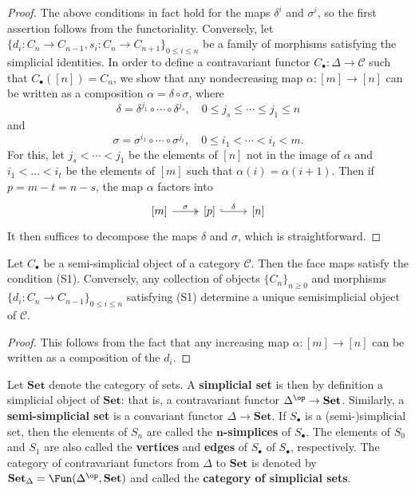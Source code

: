 \begin{proof}
The above conditions in fact hold for the maps $\delta^i$ and $\sigma^i$, so the first assertion follows from the functoriality. Conversely, let $\{d_i:C_n\to C_{n-1},s_i:C_n\to C_{n+1}\}_{0\leq i\leq n}$ be a family of morphisms satisfying the simplicial identities. In order to define a contravariant functor $C_\bullet:\Delta\to\mathcal{C}$ such that $C_\bullet([n])=C_n$, we show that any nondecreasing map $\alpha:[m]\to[n]$ can be written as a composition $\alpha=\delta\circ\sigma$, where
\[\delta=\delta^{j_1}\circ\cdots\circ\delta^{j_s},\quad 0\leq j_s\leq\cdots\leq j_1\leq n\]
and
\[\sigma=\sigma^{i_1}\circ\cdots\circ\sigma^{j_t},\quad 0\leq i_1<\cdots<i_t<m.\]
For this, let $j_s<\cdots<j_1$ be the elements of $[n]$ not in the image of $\alpha$ and $i_1<\dots<i_t$ be the elements of $[m]$ such that $\alpha(i)=\alpha(i+1)$. Then if $p=m-t=n-s$, the map $\alpha$ factors into
\[\begin{tikzcd}
{[m]}\ar[r,two heads,"\sigma"]&{[p]}\ar[r,hook,"\delta"]&{[n]}
\end{tikzcd}\]
It then suffices to decompose the maps $\delta$ and $\sigma$, which is straightforward.
\end{proof}
\begin{corollary}\label{semi-simplicial set face map char}
Let $C_\bullet$ be a semi-simplicial object of a category $\mathcal{C}$. Then the face maps satisfy the condition (S1). Conversely, any collection of objects $\{C_n\}_{n\geq 0}$ and morphisms $\{d_i:C_n\to C_{n-1}\}_{0\leq i\leq n}$ satisfying (S1) determine a unique semisimplicial object of $\mathcal{C}$.
\end{corollary}
\begin{proof}
This follows from the fact that any increasing map $\alpha:[m]\to[n]$ can be written as a composition of the $d_i$.
\end{proof}
Let $\mathbf{Set}$ denote the category of sets. A \textbf{simplicial set} is then by definition a simplicial object of $\mathbf{Set}$: that is, a contravariant functor $\Delta^{\op}\to\mathbf{Set}$. Similarly, a \textbf{semi-simplicial set} is a convariant functor $\Delta\to\mathbf{Set}$. If $S_\bullet$ is a (semi-)simplicial set, then the elements of $S_n$ are called the \textbf{$\bm{n}$-simplices} of $S_\bullet$. The elements of $S_0$ and $S_1$ are also called the \textbf{vertices} and \textbf{edges} of $S_\bullet$ of $S_\bullet$, respectively. The category of contravariant functors from $\Delta$ to $\mathbf{Set}$ is denoted by $\mathbf{Set}_\Delta=\Fun(\Delta^{\op},\mathbf{Set})$ and called the \textbf{category of simplicial sets}.
